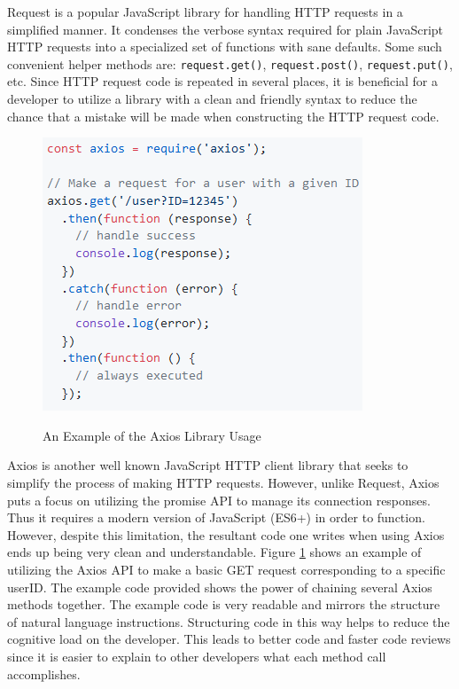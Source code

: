 \documentclass[12pt]{report}
\begin{document}
Request is a popular JavaScript library for handling HTTP requests in a simplified manner. It condenses the verbose syntax required for plain JavaScript HTTP requests into a specialized set of functions with sane defaults. Some such convenient helper methods are: \texttt{request.get()}, \texttt{request.post()}, \texttt{request.put()}, etc. Since HTTP request code is repeated in several places, it is beneficial for a developer to utilize a library with a clean and friendly syntax to reduce the chance that a mistake will be made when constructing the HTTP request code.

\begin{figure}[h]
	\centering
	\caption{An Example of the Axios Library Usage}
	\includegraphics[scale=0.5]{axios_example}
	\label{fig:axiosexample}
\end{figure}

Axios is another well known JavaScript HTTP client library that seeks to simplify the process of making HTTP requests. However, unlike Request, Axios puts a focus on utilizing the promise API to manage its connection responses. Thus it requires a modern version of JavaScript (ES6+) in order to function. However, despite this limitation, the resultant code one writes when using Axios ends up being very clean and understandable. Figure \ref{fig:axiosexample} shows an example of utilizing the Axios API to make a basic GET request corresponding to a specific userID.\cite{axiosgithub} The example code provided shows the power of chaining several Axios methods together. The example code is very readable and mirrors the structure of natural language instructions. Structuring code in this way helps to reduce the cognitive load on the developer. This leads to better code and faster code reviews since it is easier to explain to other developers what each method call accomplishes.
\end{document}
